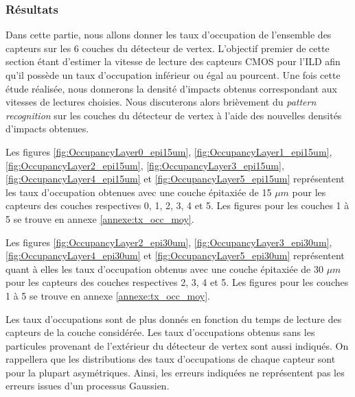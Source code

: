  
  \subsubsection{R\'esultats}
  
  Dans cette partie, nous allons donner les taux d'occupation de l'ensemble des capteurs sur les 6 couches du d\'etecteur de vertex. L'objectif premier de cette section \'etant d'estimer la vitesse de lecture des capteurs CMOS pour l'ILD afin qu'il poss\`ede un taux d'occupation inf\'erieur ou \'egal au pourcent. Une fois cette \'etude r\'ealis\'ee, nous donnerons la densit\'e d'impacts obtenus correspondant aux vitesses de lectures choisies. Nous discuterons alors brièvement du \textit{pattern recognition} sur les couches du d\'etecteur de vertex \`a l'aide des nouvelles densit\'es d'impacts obtenues.
  
  \medskip
  
  Les figures \ref{fig:OccupancyLayer0_epi15um}, \ref{fig:OccupancyLayer1_epi15um}, \ref{fig:OccupancyLayer2_epi15um}, \ref{fig:OccupancyLayer3_epi15um}, \ref{fig:OccupancyLayer4_epi15um} et \ref{fig:OccupancyLayer5_epi15um} repr\'esentent les taux d'occupation obtenues avec une couche \'epitaxi\'ee de 15 $\mu m$ pour les capteurs des couches respectives 0, 1, 2, 3, 4 et 5. Les figures pour les couches 1 \`a 5 se trouve en annexe \ref{annexe:tx_occ_moy}.
  
  \medskip
  
  Les figures \ref{fig:OccupancyLayer2_epi30um}, \ref{fig:OccupancyLayer3_epi30um}, \ref{fig:OccupancyLayer4_epi30um} et \ref{fig:OccupancyLayer5_epi30um} repr\'esentent quant \`a elles les taux d'occupation obtenus avec une couche \'epitaxi\'ee de 30 $\mu m$ pour les capteurs des couches respectives 2, 3, 4 et 5. Les figures pour les couches 1 \`a 5 se trouve en annexe \ref{annexe:tx_occ_moy}.
  
  \medskip
  
  Les taux d'occupations sont de plus donn\'es en fonction du temps de lecture des capteurs de la couche consid\'er\'ee. Les taux d'occupations obtenus sans les particules provenant de l'ext\'erieur du d\'etecteur de vertex sont aussi indiqu\'es. On rappellera que les distributions des taux d'occupations de chaque capteur sont pour la plupart asym\'etriques. Ainsi, les erreurs indiqu\'ees ne repr\'esentent pas les erreurs issues d'un processus Gaussien.   
  
